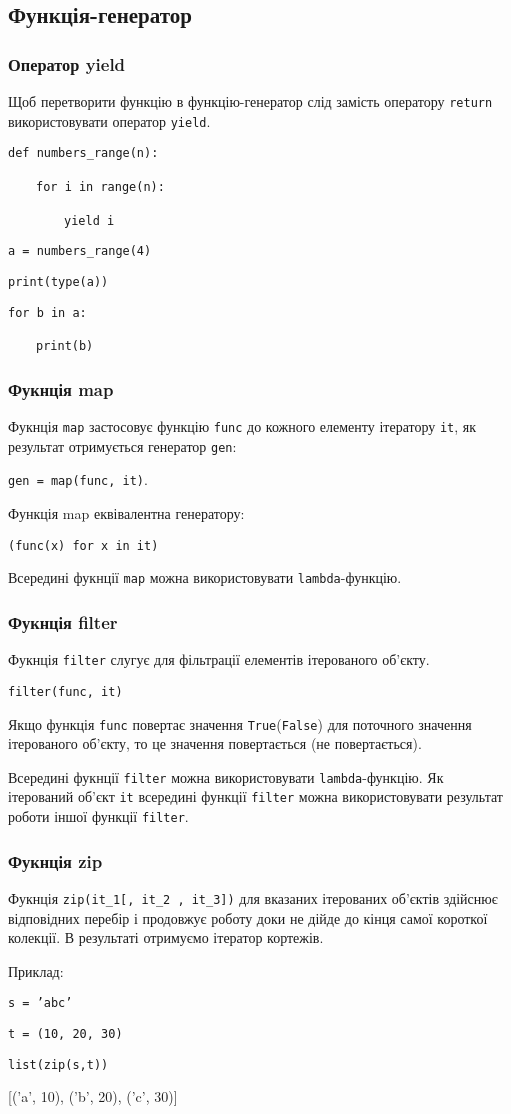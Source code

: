 \subsection{Функція-генератор} 
\begin{frame}
\frametitle{Оператор yield}
Щоб перетворити функцію в функцію-генератор слід замість оператору \texttt{return} використовувати оператор \texttt{yield}.

\texttt{def numbers\_range(n):}

~~~~\texttt{for i in range(n):}

~~~~~~~~\texttt{yield i}   
        
\texttt{a = numbers\_range(4)}

\texttt{print(type(a))}

\texttt{for b in a:}

~~~~\texttt{print(b)}
\end{frame}

\begin{frame}
\frametitle{Фукнція map}
Фукнція \texttt{map} застосовує функцію \texttt{func} до кожного елементу ітератору \texttt{it}, як результат отримується генератор \texttt{gen}: 

\texttt{gen = map(func, it)}. 

Функція map еквівалентна генератору:

\texttt{(func(x) for x in it)}

Всередині фукнції \texttt{map} можна використовувати \texttt{lambda}-функцію. 
\end{frame}

\begin{frame}
\frametitle{Фукнція filter}
Фукнція \texttt{filter} слугує для фільтрації елементів ітерованого об'єкту.

\texttt{filter(func, it)}

Якщо функція \texttt{func} повертає значення \texttt{True}(\texttt{False}) для поточного значення ітерованого об'єкту, то це значення повертається (не повертається).

Всередині фукнції \texttt{filter} можна використовувати \texttt{lambda}-функцію. Як ітерований об'єкт \texttt{it} всередині функції \texttt{filter}  можна використовувати результат роботи іншої функції \texttt{filter}.
\end{frame}

\begin{frame}
\frametitle{Фукнція zip}
Фукнція \texttt{zip(it\_1[, it\_2 , it\_3])} для вказаних ітерованих об'єктів здійснює відповідних перебір і продовжує роботу доки не дійде до кінця самої короткої колекції. В результаті отримуємо ітератор кортежів.

Приклад:

\texttt{s = 'abc'}

\texttt{t = (10, 20, 30)}

\texttt{list(zip(s,t))}

[('a', 10), ('b', 20), ('c', 30)]
\end{frame}

